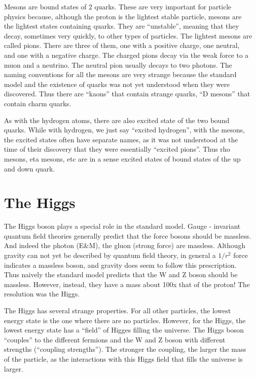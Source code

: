 Mesons are bound states of 2 quarks.  These are very important for particle physics because, although the proton is the lightest stable particle, mesons are the lightest states containing quarks.  They are “unstable”, meaning that they decay, sometimes very quickly, to other types of particles.
The lightest mesons are called pions.  There are three of them, one with a positive charge, one neutral, and one with a negative charge.  The charged pions decay via the weak force to a muon and a neutrino.  The neutral pion usually decays to two photons.
The naming conventions for all the mesons are very strange because the standard model and the existence of quarks was not yet understood when they were discovered.  Thus there are “kaons” that contain strange quarks, “D mesons” that contain charm quarks.

As with the hydrogen atoms, there are also excited state of the two bound quarks.  While with hydrogen, we just say “excited hydrogen”, with the mesons, the excited states often have separate names, as it was not understood at the time of their discovery that they were essentially “excited pions”.  Thus rho mesons, eta mesons, etc are in a sense excited states of bound states of the up and down quark.

\section{The Higgs}
The  Higgs  boson  plays  a  special  role  in  the  standard  model.    Gauge
-
invariant  quantum  field  theories 
generally 
predict  that  the  force  bosons  should  be  massless.    And  indeed  the  photon  (E\&M),  the  gluon 
(strong force) are massless.  Although gravity can not yet be described by quantum field theory, in general a 
$1/r^2$ force indicates a massless boson, and gravity does
seem to follow this prescription.   Thus naively the 
standard model predicts that the W and Z boson should be massless.  However, instead, they have a mass 
about 100x that of the proton!  
The resolution was the Higgs.

The Higgs has several strange properties.  For all other particles, the lowest energy state is the one where there are no particles.  However, for the Higgs, the lowest energy state has a ``field'' of Higges filling the universe.  The Higgs boson ``couples'' to the different fermions and the W and Z boson with different strengths (``coupling strengths'').  The stronger the coupling, the larger the mass of the particle, as the interactions with this Higgs field that fills the universe is larger.

